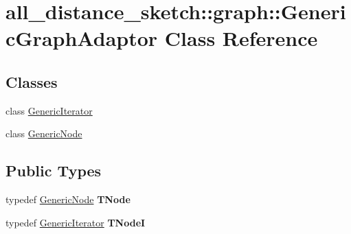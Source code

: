 \hypertarget{classall__distance__sketch_1_1graph_1_1GenericGraphAdaptor}{}\section{all\+\_\+distance\+\_\+sketch\+:\+:graph\+:\+:Generic\+Graph\+Adaptor Class Reference}
\label{classall__distance__sketch_1_1graph_1_1GenericGraphAdaptor}
\subsection*{Classes}
\begin{DoxyCompactItemize}
\item 
class \hyperlink{classall__distance__sketch_1_1graph_1_1GenericGraphAdaptor_1_1GenericIterator}{Generic\+Iterator}
\item 
class \hyperlink{classall__distance__sketch_1_1graph_1_1GenericGraphAdaptor_1_1GenericNode}{Generic\+Node}
\end{DoxyCompactItemize}
\subsection*{Public Types}
\begin{DoxyCompactItemize}
\item 
\hypertarget{classall__distance__sketch_1_1graph_1_1GenericGraphAdaptor_a7a070458ed387001db977cdec0f8ae7d}{}typedef \hyperlink{classall__distance__sketch_1_1graph_1_1GenericGraphAdaptor_1_1GenericNode}{Generic\+Node} {\bfseries T\+Node}\label{classall__distance__sketch_1_1graph_1_1GenericGraphAdaptor_a7a070458ed387001db977cdec0f8ae7d}

\item 
\hypertarget{classall__distance__sketch_1_1graph_1_1GenericGraphAdaptor_ab851003a3b25260e9f6032550a7f0a88}{}typedef \hyperlink{classall__distance__sketch_1_1graph_1_1GenericGraphAdaptor_1_1GenericIterator}{Generic\+Iterator} {\bfseries T\+Node\+I}\label{classall__distance__sketch_1_1graph_1_1GenericGraphAdaptor_ab851003a3b25260e9f6032550a7f0a88}

\end{DoxyCompactItemize}
